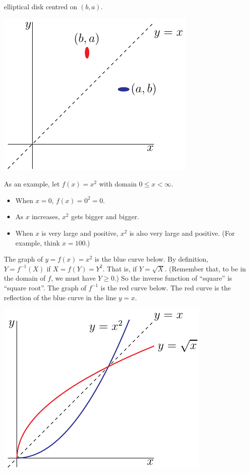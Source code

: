 elliptical disk centred on $(b,a)$.
\begin{wfig}
\begin{center}
   \includegraphics{fInvR}
\end{center}
\end{wfig}

\begin{eg}\label{eg:INVlogbaseten}
As an example, let $f(x) = x^2$ with domain $0\le x< \infty$.
\begin{itemize}\itemsep1pt \parskip0pt  \itemindent 10pt
\item
When $x=0$, $f(x)=0^2=0$.
\item
As $x$ increases, $x^2$ gets bigger and bigger.
\item
When $x$ is very large and positive,
$x^2$ is also very large and positive.
(For example, think $x=100$.)
\end{itemize}
The graph of $y=f(x)=x^2$ is the blue curve below.
By definition, $Y=f^{-1}(X)$ if $X=f(Y)=Y^2$. That is, if $Y=\sqrt{X}$.
(Remember that, to be in the domain of $f$, we must have $Y\ge 0$.)
So the inverse function of ``square'' is ``square root''. The
graph of $f^{-1}$ is the red curve below. The red curve is the
reflection of the blue curve in the line $y=x$.
\begin{wfig}
\begin{center}
   \includegraphics{fInvSqA}
\end{center}
\end{wfig}
\end{eg}
